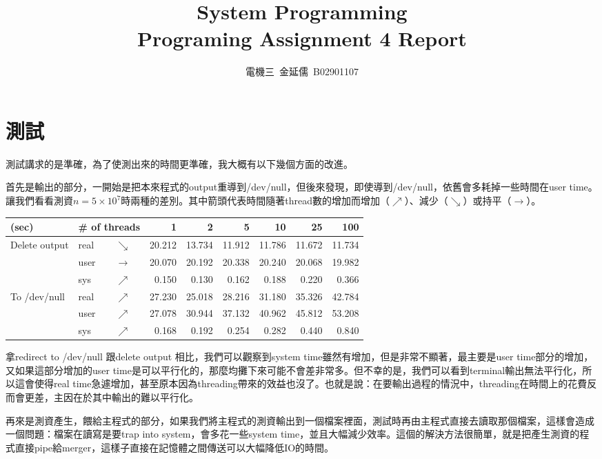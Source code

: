 \documentclass[12pt, a4paper]{article}
\title{System Programming\\Programing Assignment 4 Report}
\author{電機三\ 金延儒\ B02901107}
\begin{document}
\maketitle
\section{測試}
測試講求的是準確，為了使測出來的時間更準確，我大概有以下幾個方面的改進。

首先是輸出的部分，一開始是把本來程式的output重導到/dev/null，但後來發現，即使導到/dev/null，依舊會多耗掉一些時間在user time。讓我們看看測資$n=5\times 10^7$時兩種的差別。其中箭頭代表時間隨著thread數的增加而增加（$\nearrow$）、減少（$\searrow$）或持平（$\rightarrow$）。

\begin{center}
\begin{tabular}{l | l l r r r r r r}
\hline
(sec)& \multicolumn{2}{|l}{\# of threads} & 1 & 2 & 5 & 10 & 25 & 100 \\ \hline
\multirow{3}{*}{Delete output}
& real & $\searrow$ & 20.212 & 13.734 & 11.912 & 11.786 & 11.672 & 11.734 \\ \cline{2-9}
& user & $\rightarrow$ & 20.070 & 20.192 & 20.338 & 20.240 & 20.068 & 19.982 \\ \cline{2-9}
& sys & $\nearrow$ & 0.150 & 0.130 & 0.162 & 0.188 & 0.220 & 0.366 \\ \hline\hline
\multirow{3}{*}{To /dev/null}
& real & $\nearrow$ & 27.230 & 25.018 & 28.216 & 31.180 & 35.326 & 42.784 \\ \cline{2-9}
& user & $\nearrow$ & 27.078 & 30.944 & 37.132 & 40.962 & 45.812 & 53.208 \\ \cline{2-9}
& sys & $\nearrow$ & 0.168 & 0.192 & 0.254 & 0.282 & 0.440 & 0.840 \\
\hline
\end{tabular}
\end{center}

拿redirect to /dev/null 跟delete output 相比，我們可以觀察到system time雖然有增加，但是非常不顯著，最主要是user time部分的增加，又如果這部分增加的user time是可以平行化的，那麼均攤下來可能不會差非常多。但不幸的是，我們可以看到terminal輸出無法平行化，所以這會使得real time急遽增加，甚至原本因為threading帶來的效益也沒了。也就是說：在要輸出過程的情況中，threading在時間上的花費反而會更差，主因在於其中輸出的難以平行化。

再來是測資產生，餵給主程式的部分，如果我們將主程式的測資輸出到一個檔案裡面，測試時再由主程式直接去讀取那個檔案，這樣會造成一個問題：檔案在讀寫是要trap into system，會多花一些system time，並且大幅減少效率。這個的解決方法很簡單，就是把產生測資的程式直接pipe給merger，這樣子直接在記憶體之間傳送可以大幅降低IO的時間。
\end{document}
